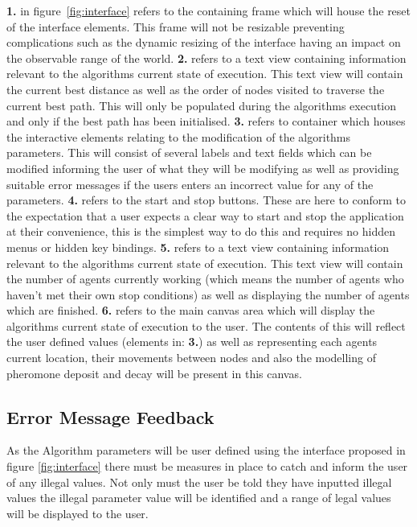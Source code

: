\noindent
\textbf{1.} in figure~\ref{fig:interface} refers to the containing frame which will house the reset of the interface elements. This frame will not be resizable preventing complications such as the dynamic resizing of the interface having an impact on the observable range of the world.
\noindent
\textbf{2.} refers to a text view containing information relevant to the algorithms current state of execution. This text view will contain the current best distance as well as the order of nodes visited to traverse the current best path. This will only be populated during the algorithms execution and only if the best path has been initialised.
\noindent
\textbf{3.} refers to container which houses the interactive elements relating to the modification of the algorithms parameters. This will consist of several labels and text fields which can be modified informing the user of what they will be modifying as well as providing suitable error messages if the users enters an incorrect value for any of the parameters.
\noindent
\textbf{4.} refers to the start and stop buttons. These are here to conform to the expectation that a user expects a clear way to start and stop the application at their convenience, this is the simplest way to do this and requires no hidden menus or hidden key bindings.
\noindent
\textbf{5.} refers to a text view containing information relevant to the algorithms current state of execution. This text view will contain the number of agents currently working (which means the number of agents who haven't met their own stop conditions) as well as displaying the number of agents which are finished.
\noindent
\textbf{6.} refers to the main canvas area which will display the algorithms current state of execution to the user. The contents of this will reflect the user defined values (elements in: \textbf{3.}) as well as representing each agents current location, their movements between nodes and also the modelling of pheromone deposit and decay will be present in this canvas.

\subsection{Error Message Feedback}
\label{error:proposal}
As the Algorithm parameters will be user defined using the interface proposed in figure \ref{fig:interface} there must be measures in place to catch and inform the user of any illegal values. Not only must the user be told they have inputted illegal values the illegal parameter value will be identified and a range of legal values will be displayed to the user.

